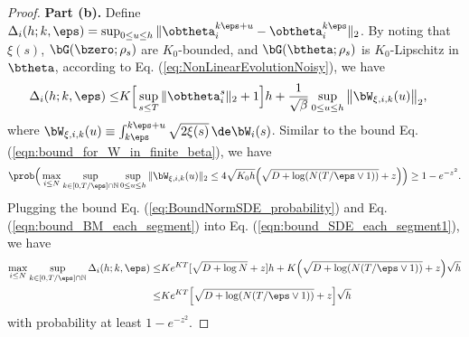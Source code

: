 \documentclass[11pt]{article}
\begin{document}
\begin{proof}
\noindent
{\bf Part (b).} 
Define $\Delta_i(h; k, \eps) = \sup_{0 \le u \le h} \| \obtheta_i^{k\eps + u} - \obtheta_i^{k\eps} \|_2$. By noting that $\xi(s)$, $\bG(\bzero; \rho_s)$ are $K_0$-bounded, and $\bG(\btheta; \rho_s)$ is $K_0$-Lipschitz in $\btheta$, according to Eq. (\ref{eq:NonLinearEvolutionNoisy}), we have
\begin{equation}\label{eqn:bound_SDE_each_segment1}
\begin{aligned}
\Delta_i(h; k, \eps) \le& K \Big[ \sup_{s \le T} \| \obtheta_i^{s} \|_2 + 1\Big] h + \frac{1}{\sqrt \beta} \sup_{0 \le u \le h} \big\|  \bW_{\xi, i, k}(u)\big\|_2, 
\end{aligned}
\end{equation}
where $\bW_{\xi, i, k}(u) \equiv \int_{k \eps}^{k\eps + u} \sqrt{2\xi(s)} \, \de \bW_i(s)$. Similar to the bound Eq. (\ref{eqn:bound_for_W_in_finite_beta}), we have 
\begin{equation}\label{eqn:bound_BM_each_segment}
\begin{aligned}
\prob\Big(\max_{i \le N}\sup_{k \in [0, T/\eps] \cap \mathbb N} \sup_{0 \le u \le h} \| \bW_{\xi, i, k}(u) \|_2 \le 4 \sqrt{K_0 h} \Big(\sqrt{D + \log (N(T/\eps \vee 1))} + z\Big) \Big) \ge  1 - e^{-z^2}. 
\end{aligned}
\end{equation}
Plugging the bound Eq. (\ref{eq:BoundNormSDE_probability}) and Eq. (\ref{eqn:bound_BM_each_segment}) into Eq. (\ref{eqn:bound_SDE_each_segment1}), we have 
\[
\begin{aligned}
\max_{i \le N} \sup_{k \in [0, T/\eps] \cap \mathbb N} \Delta_i(h; k, \eps) \le& K e^{KT}  [\sqrt{D + \log N} + z] h + K\Big(\sqrt{D + \log (N(T/\eps \vee 1))} + z\Big) \sqrt{h}\\
\le&  K e^{KT} \Big[\sqrt{D + \log (N (T / \eps \vee 1))} + z\Big] \sqrt{h}
\end{aligned}
\]
with probability at least $1 - e^{-z^2}$. 


\end{proof}
\end{document}
